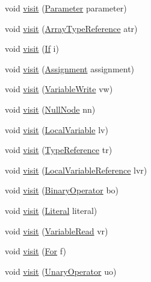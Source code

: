 \begin{DoxyCompactItemize}
void \hyperlink{interfacemain_1_1_visitor_aafc4c4e5b5ee22122a0b8e7ffd581b72}{visit} (\hyperlink{classparser_1_1_parameter}{Parameter} parameter)
\item 
void \hyperlink{interfacemain_1_1_visitor_a7c498c62d42f788316548fa7648724fa}{visit} (\hyperlink{classparser_1_1_array_type_reference}{Array\+Type\+Reference} atr)
\item 
void \hyperlink{interfacemain_1_1_visitor_a06dd957e145bea2eb026e044aa3f3119}{visit} (\hyperlink{classparser_1_1_if}{If} i)
\item 
void \hyperlink{interfacemain_1_1_visitor_a6e938f696967e376deab5565b4223ad0}{visit} (\hyperlink{classparser_1_1_assignment}{Assignment} assignment)
\item 
void \hyperlink{interfacemain_1_1_visitor_a7f90cf95f580cceafb2fea1e2283f74a}{visit} (\hyperlink{classparser_1_1_variable_write}{Variable\+Write} vw)
\item 
void \hyperlink{interfacemain_1_1_visitor_a1437a93c8b8b41c3082c593ed0fd4ce5}{visit} (\hyperlink{classparser_1_1_null_node}{Null\+Node} nn)
\item 
void \hyperlink{interfacemain_1_1_visitor_adadc51a0b50d0c0ff4b4e96f60f17b80}{visit} (\hyperlink{classparser_1_1_local_variable}{Local\+Variable} lv)
\item 
void \hyperlink{interfacemain_1_1_visitor_af509944ff15a0958d290a3c82ef672bf}{visit} (\hyperlink{classparser_1_1_type_reference}{Type\+Reference} tr)
\item 
void \hyperlink{interfacemain_1_1_visitor_afd63e1757a2f3ab052b8c9c5c9698d66}{visit} (\hyperlink{classparser_1_1_local_variable_reference}{Local\+Variable\+Reference} lvr)
\item 
void \hyperlink{interfacemain_1_1_visitor_a252083abc17a52a6e72bd823f9c2b9c6}{visit} (\hyperlink{classparser_1_1_binary_operator}{Binary\+Operator} bo)
\item 
void \hyperlink{interfacemain_1_1_visitor_a62b8935cfe6f21af68dab1ed7b24a9eb}{visit} (\hyperlink{classparser_1_1_literal}{Literal} literal)
\item 
void \hyperlink{interfacemain_1_1_visitor_aecb22f6c1d21ebcbb33b09baa10ed68c}{visit} (\hyperlink{classparser_1_1_variable_read}{Variable\+Read} vr)
\item 
void \hyperlink{interfacemain_1_1_visitor_a1e5d17ad311979a5e2810e9447522409}{visit} (\hyperlink{classparser_1_1_for}{For} f)
\item 
void \hyperlink{interfacemain_1_1_visitor_a25c0cf12936de74a7626164514a48628}{visit} (\hyperlink{classparser_1_1_unary_operator}{Unary\+Operator} uo)

\end{DoxyCompactItemize}
